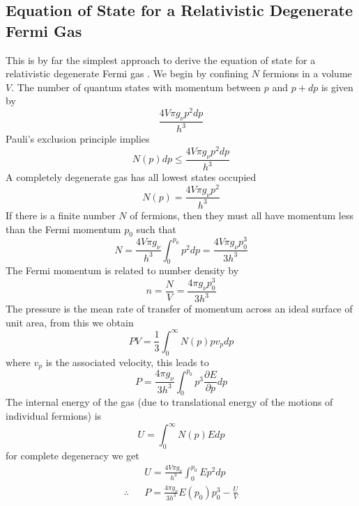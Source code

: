 \subsection{Equation of State for a Relativistic Degenerate Fermi Gas}
This is by far the simplest approach to derive the equation of state for a relativistic degenerate Fermi gas \cite{ref_chandra}.
We begin by confining $N$ fermions in a volume $V$. The number of quantum states with momentum between $p$ and $p+dp$ is given by
\begin{equation}
	\frac{4 V \pi g_\nu p^2 dp}{h^3}
	\label{eqn_chandra1}
\end{equation}
Pauli's exclusion principle implies
\begin{equation}
	N(p)dp \le \frac{4 V \pi g_\nu p^2 dp}{h^3}
	\label{eqn_chandra2}
\end{equation}
A completely degenerate gas has all lowest states occupied
\begin{equation}
	N(p) = \frac{4 V \pi g_\nu p^2}{h^3}
	\label{eqn_chandra3}
\end{equation}
If there is a finite number $N$ of fermions, then they must all have momentum less than the Fermi momentum $p_0$ such that
\begin{equation}
	N = \frac{4 V \pi g_\nu}{h^3} \int_0^{p_0}p^2dp = \frac{4 V \pi g_\nu p_0^3}{3 h^3}
	\label{eqn_chandra4}
\end{equation}
The Fermi momentum is related to number density by
\begin{equation}
	n = \frac{N}{V} = \frac{4 \pi g_\nu p_0^3}{3 h^3}
	\label{eqn_chandra5}
\end{equation}
The pressure is the mean rate of transfer of momentum across an ideal surface of unit area, from this we obtain
\begin{equation}
	PV=\frac{1}{3} \int_0^{\infty}N(p)pv_pdp
	\label{eqn_chandra6}
\end{equation}
where $v_p$ is the associated velocity, this leads to
\begin{equation}
	P=\frac{4\pi g_\nu}{3h^3} \int_0^{p_0}p^3\frac{\partial E}{\partial p}dp
	\label{eqn_chandra7}
\end{equation}
The internal energy of the gas (due to translational energy of the motions of individual fermions) is
\begin{equation}
	U=\int_0^\infty N(p) E dp
	\label{eqn_chandra8}
\end{equation}
for complete degeneracy we get
\begin{eqnarray}
	&&U=\frac{4V\pi g_\nu}{h^3} \int_0^{p_0} E p^2 dp
	\label{eqn_chandra9} \\
	\therefore &&P = \frac{4\pi g_\nu}{3h^3} E(p_0)p_0^3 - \frac{U}{V}
	\label{eqn_chandra10}
\end{eqnarray}
